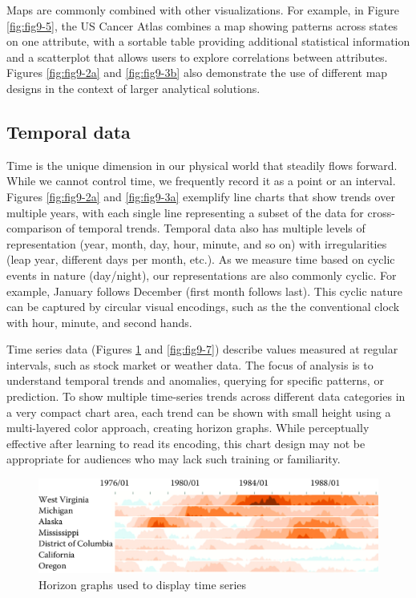 \documentclass[]{krantz}
\begin{document}
Maps are commonly combined with other visualizations. For example, in
Figure \ref{fig:fig9-5}, the US Cancer Atlas combines a map showing
patterns across states on one attribute, with a sortable table providing
additional statistical information and a scatterplot that allows users
to explore correlations between attributes. Figures \ref{fig:fig9-2a}
and \ref{fig:fig9-3b} also demonstrate the use of different map designs
in the context of larger analytical solutions.

\subsection{Temporal data}\label{sec:viz-2.4}

Time is the unique dimension in our physical world that steadily flows
forward. While we cannot control time, we frequently record it as a
point or an interval. Figures \ref{fig:fig9-2a} and \ref{fig:fig9-3a}
exemplify line charts that show trends over multiple years, with each
single line representing a subset of the data for cross-comparison of
temporal trends. Temporal data also has multiple levels of
representation (year, month, day, hour, minute, and so on) with
irregularities (leap year, different days per month, etc.). As we
measure time based on cyclic events in nature (day/night), our
representations are also commonly cyclic. For example, January follows
December (first month follows last). This cyclic nature can be captured
by circular visual encodings, such as the the conventional clock with
hour, minute, and second hands.

Time series data (Figures \ref{fig:fig9-6} and \ref{fig:fig9-7})
describe values measured at regular intervals, such as stock market or
weather data. The focus of analysis is to understand temporal trends and
anomalies, querying for specific patterns, or prediction. To show
multiple time-series trends across different data categories in a very
compact chart area, each trend can be shown with small height using a
multi-layered color approach, creating horizon graphs. While
perceptually effective after learning to read its encoding, this chart
design may not be appropriate for audiences who may lack such training
or familiarity.

\begin{figure}

{\centering \includegraphics[width=0.9\linewidth]{ChapterViz/figures/fig9-6} 

}

\caption{Horizon graphs used to display time series}\label{fig:fig9-6}
\end{figure}
\end{document}
